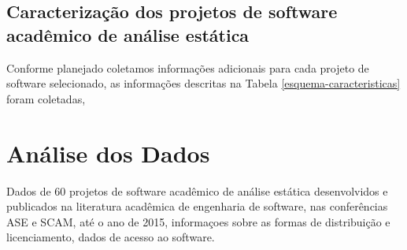

\subsection{Caracterização dos projetos de software acadêmico de análise estática} %

Conforme planejado coletamos informações adicionais para cada projeto de
software selecionado, as informações descritas na Tabela
\ref{esquema-caracteristicas} foram coletadas,





\section{Análise dos Dados} \label{estudo1:analise}

Dados de 60 projetos de software acadêmico de análise estática desenvolvidos e
publicados na literatura acadêmica de engenharia de software, nas conferências
ASE e SCAM, até o ano de 2015, informaçoes sobre as formas de distribuição e
licenciamento, dados de acesso ao software.




